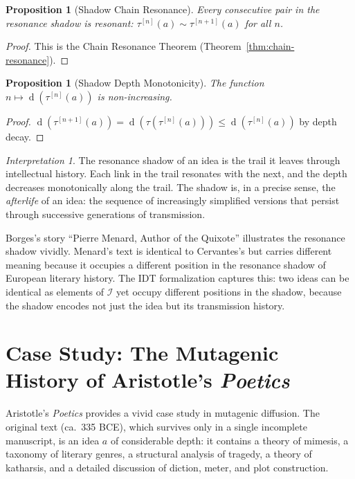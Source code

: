 \documentclass[11pt,openany]{book}
\theoremstyle{definition}
\theoremstyle{plain}
\newtheorem{proposition}[axiom]{Proposition}
\theoremstyle{remark}
\newtheorem{interpretation}[axiom]{Interpretation}
\newcommand{\IS}{\mathcal{I}}               %
\newcommand{\res}{\sim}                      %
\newcommand{\depth}{\operatorname{d}}       %
\newcommand{\transmit}{\tau}                 %
\begin{document}
\begin{proposition}[Shadow Chain Resonance]
Every consecutive pair in the resonance shadow is resonant: $\transmit^{[n]}(a) \res \transmit^{[n+1]}(a)$ for all $n$.
\end{proposition}

\begin{proof}
This is the Chain Resonance Theorem (Theorem~\ref{thm:chain-resonance}).
\end{proof}

\begin{proposition}[Shadow Depth Monotonicity]
The function $n \mapsto \depth(\transmit^{[n]}(a))$ is non-increasing.
\end{proposition}

\begin{proof}
$\depth(\transmit^{[n+1]}(a)) = \depth(\transmit(\transmit^{[n]}(a))) \leq \depth(\transmit^{[n]}(a))$ by depth decay.
\end{proof}

\begin{interpretation}
The resonance shadow of an idea is the trail it leaves through intellectual history. Each link in the trail resonates with the next, and the depth decreases monotonically along the trail. The shadow is, in a precise sense, the \emph{afterlife} of an idea: the sequence of increasingly simplified versions that persist through successive generations of transmission.

Borges's story ``Pierre Menard, Author of the Quixote'' illustrates the resonance shadow vividly. Menard's text is identical to Cervantes's but carries different meaning because it occupies a different position in the resonance shadow of European literary history. The IDT formalization captures this: two ideas can be identical as elements of $\IS$ yet occupy different positions in the shadow, because the shadow encodes not just the idea but its transmission history.
\end{interpretation}

\section{Case Study: The Mutagenic History of Aristotle's \emph{Poetics}}

Aristotle's \emph{Poetics} provides a vivid case study in mutagenic diffusion. The original text (ca.\ 335 BCE), which survives only in a single incomplete manuscript, is an idea $a$ of considerable depth: it contains a theory of mimesis, a taxonomy of literary genres, a structural analysis of tragedy, a theory of katharsis, and a detailed discussion of diction, meter, and plot construction.
\end{document}
